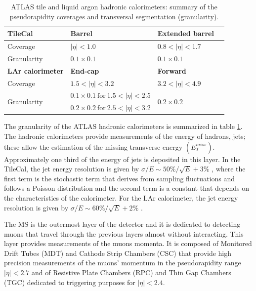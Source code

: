 \begin{table}
	\centering
	\caption{ATLAS tile and liquid argon hadronic calorimeters: summary of the pseudorapidity coverages and transversal segmentation (granularity).}
	\begin{tabular}{llll}
		\toprule 
		\textbf{TileCal} & \textbf{Barrel} & \textbf{Extended barrel} &\\
		\midrule
		\rowcolor{black!7}Coverage & $|\eta|<1.0$ & $0.8<|\eta|<1.7$  & \\
		Granularity & $0.1\times 0.1$ & $0.1\times 0.1$ & \\
		\midrule \midrule
		\textbf{LAr calorimeter} & \textbf{End-cap} & \textbf{Forward} &\\
		\midrule
		\rowcolor{black!7}Coverage & $1.5<|\eta|<3.2$ & $3.2<|\eta|<4.9$  &  \\
		\multirow{2}{*}{Granularity} & $0.1\times 0.1 ~\text{for}~ 1.5<|\eta|<2.5$ & \multirow{2}{*}{$0.2\times 0.2$} & \\
		& $0.2\times 0.2 ~\text{for}~ 2.5<|\eta|<3.2$ & & \\
		\bottomrule
	\end{tabular}
	\label{table:ATLAS_HCAL}
\end{table}
\renewcommand{\arraystretch}{1.}
The granularity of the ATLAS hadronic calorimeters is summarized in table \ref{table:ATLAS_HCAL}.
The hadronic calorimeters provide measurements of the energy of hadrons, jets; these allow the estimation of the missing transverse energy $\left(E_T^{miss}\right)$. Approximately one third of the energy of jets is deposited in this layer. In the TileCal, the jet energy resolution is given by $\sigma/E\sim 50\%/\sqrt{E}+3\%$ \cite{TileCalTech},
where the first term is the stochastic term that derives from sampling fluctuations and follows a Poisson distribution and the second term is a constant that depends on the characteristics of the calorimeter. For the LAr calorimeter, the jet energy resolution is given by $\sigma/E\sim 60\%/\sqrt{E}+2\%$ \cite{ATLAS_LAr_TDR}.

The MS is the outermost layer of the detector and it is dedicated to detecting muons that travel through the previous layers almost without interacting. This layer provides measurements of the muons momenta. It is composed of Monitored Drift Tubes (MDT) and Cathode Strip Chambers (CSC) that provide high precision measurements of the muons' momentum in the pseudorapidity range $|\eta|<2.7$ and of Resistive Plate Chambers (RPC) and Thin Gap Chambers (TGC) dedicated to triggering purposes for $|\eta|<2.4$.

